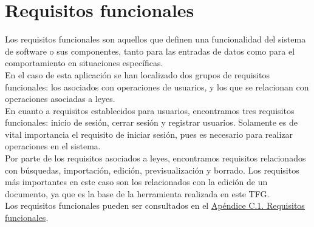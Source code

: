 \section{Requisitos funcionales}

Los requisitos funcionales \cite{requisitos} son aquellos que definen una funcionalidad del sistema de software o sus componentes, tanto para las entradas de datos como para el comportamiento en situaciones específicas.
\\

En el caso de esta aplicación se han localizado dos grupos de requisitos funcionales: los asociados con operaciones de usuarios, y los que se relacionan con operaciones asociadas a leyes.
\\

En cuanto a requisitos establecidos para usuarios, encontramos tres requisitos funcionales: inicio de sesión, cerrar sesión y registrar usuarios. Solamente es de vital importancia el requisito de iniciar sesión, pues es necesario para realizar operaciones en el sistema.
\\

Por parte de los requisitos asociados a leyes, encontramos requisitos relacionados con búsquedas, importación, edición, previsualización y borrado. Los requisitos más importantes en este caso son los relacionados con la edición de un documento, ya que es la base de la herramienta realizada en este TFG.
\\

Los requisitos funcionales pueden ser consultados en el \hyperref[APRequisitosFuncionales]{Apéndice C.1. Requisitos funcionales}.
